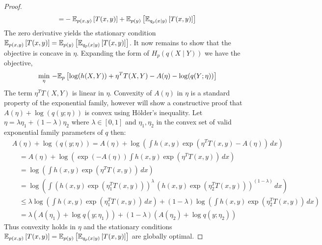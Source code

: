 \begin{proof}
\begin{align}
        =&-\mathbb{E}_{p(x,y)}\left[T(x,y)\right]+\mathbb{E}_{p(y)}\left[\mathbb{E}_{q_p(x|y)}\left[T(x,y)\right]\right]\\
    \end{align}
    The zero derivative yields the stationary condition
    \mbox{$\mathbb{E}_{p(x,y)}\left[T(x,y)\right]=\mathbb{E}_{p(y)}\left[\mathbb{E}_{q_p(x|y)}\left[T(x,y)\right]\right]$}. It
    now remains to show that the objective is concave in $\eta$.
    Expanding the form of $H_p(q(X\mid Y))$ we have the objective,
    \begin{equation}
      \min_\eta \, - \mathbb{E}_p\left[ \log(h(X,Y)) + \eta^TT(X,Y) - A(\eta)
        - \log( q(Y;\eta) ) \right]
    \end{equation}
    The term $\eta^T T(X,Y)$ is linear in $\eta$.  Convexity of
    $A(\eta)$ in $\eta$ is a standard property of the exponential
    family, however will show a constructive proof that $A(\eta) +
    \log(q(y;\eta))$ is convex using H\"older's inequality.  Let $\eta
    = \lambda \eta_1 + (1-\lambda) \eta_2$ where $\lambda \in [0,1]$
    and $\eta_1, \eta_2$ in the convex set of valid exponential family
    parameters of $q$ then:
    \begin{align}
      &A(\eta) + \log(q(y;\eta)) = A(\eta) + \log\left( \int h(x,y)
      \exp( \eta^T T(x,y) - A(\eta)) \, dx \right) \\
      &\quad = A(\eta) + \log\left( \exp(-A(\eta)) \int h(x,y)
      \exp(\eta^T T(x,y)) \, dx \right) \\
      &\quad = \log \left( \int h(x,y) \exp(\eta^T T(x,y)) \, dx
      \right) \\
      &\quad =\log \left( \int(h(x,y)\exp(\eta_1^T T(x,y)))^\lambda
      \, (h(x,y)\exp(\eta_2^T T(x,y)))^{(1-\lambda)} \, dx \right) \\
      &\quad \leq \lambda \log \left( \int h(x,y) \exp(\eta_1^T T(x,y)) \, dx
      \right) + (1-\lambda) \log \left( \int h(x,y) \exp(\eta_2^T
      T(x,y)) \, dx \right) \\
      &\quad = \lambda(A(\eta_1) + \log q(y;\eta_1)) +
      (1-\lambda)(A(\eta_2) + \log q(y;\eta_2))
    \end{align}
    Thus convexity holds in $\eta$ and the stationary conditions
    \mbox{$\mathbb{E}_{p(x,y)}\left[T(x,y)\right]=\mathbb{E}_{p(y)}\left[\mathbb{E}_{q_p(x|y)}\left[T(x,y)\right]\right]$}
    are globally optimal.
\end{proof}

